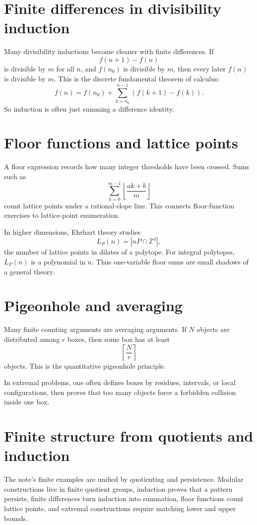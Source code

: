 \section{Finite differences in divisibility induction}

Many divisibility inductions become cleaner with finite differences.  If
\[
  f(n+1)-f(n)
\]
is divisible by \(m\) for all \(n\), and \(f(n_0)\) is divisible by \(m\), then every later \(f(n)\) is divisible by \(m\).  This is the discrete fundamental theorem of calculus:
\[
  f(n)=f(n_0)+\sum_{k=n_0}^{n-1}(f(k+1)-f(k)).
\]
So induction is often just summing a difference identity.

\section{Floor functions and lattice points}

A floor expression records how many integer thresholds have been crossed.  Sums such as
\[
  \sum_{k=0}^{m-1}\left\lfloor \frac{ak+b}{m}\right\rfloor
\]
count lattice points under a rational-slope line.  This connects floor-function exercises to lattice-point enumeration.

In higher dimensions, Ehrhart theory studies
\[
  L_P(n)=|nP\cap\mathbb Z^d|,
\]
the number of lattice points in dilates of a polytope.  For integral polytopes, \(L_P(n)\) is a polynomial in \(n\).  Thus one-variable floor sums are small shadows of a general theory.

\section{Pigeonhole and averaging}

Many finite counting arguments are averaging arguments.  If \(N\) objects are distributed among \(r\) boxes, then some box has at least
\[
  \left\lceil \frac Nr\right\rceil
\]
objects.  This is the quantitative pigeonhole principle.

In extremal problems, one often defines boxes by residues, intervals, or local configurations, then proves that too many objects force a forbidden collision inside one box.

\section{Finite structure from quotients and induction}

The note's finite examples are unified by quotienting and persistence.  Modular constructions live in finite quotient groups, induction proves that a pattern persists, finite differences turn induction into summation, floor functions count lattice points, and extremal constructions require matching lower and upper bounds.
